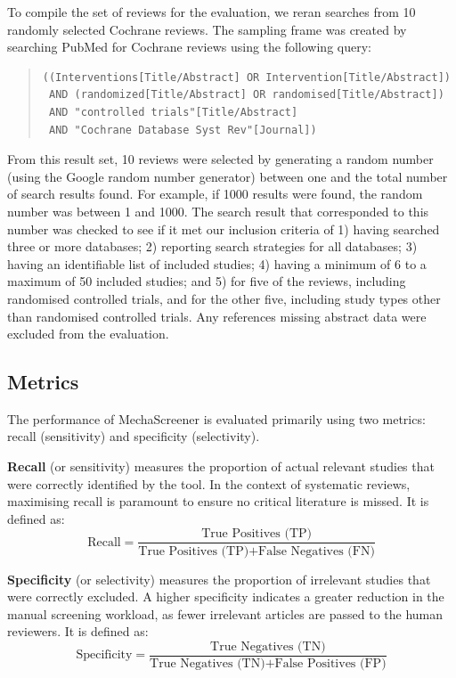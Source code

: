 \documentclass[11pt,a4paper]{article}
\begin{document}
To compile the set of reviews for the evaluation, we reran searches from 10 randomly selected Cochrane reviews. The sampling frame was created by searching PubMed for Cochrane reviews using the following query:
\begin{quote}
\begin{verbatim}
((Interventions[Title/Abstract] OR Intervention[Title/Abstract])
 AND (randomized[Title/Abstract] OR randomised[Title/Abstract])
 AND "controlled trials"[Title/Abstract]
 AND "Cochrane Database Syst Rev"[Journal])
\end{verbatim}
\end{quote}
From this result set, 10 reviews were selected by generating a random number (using the Google random number generator) between one and the total number of search results found. For example, if 1000 results were found, the random number was between 1 and 1000. The search result that corresponded to this number was checked to see if it met our inclusion criteria of 1) having searched three or more databases; 2) reporting search strategies for all databases; 3) having an identifiable list of included studies; 4) having a minimum of 6 to a maximum of 50 included studies; and 5) for five of the reviews, including randomised controlled trials, and for the other five, including study types other than randomised controlled trials. Any references missing abstract data were excluded from the evaluation.

\subsection{Metrics}

The performance of MechaScreener is evaluated primarily using two metrics: recall (sensitivity) and specificity (selectivity). \bigbreak

\textbf{Recall} (or sensitivity) measures the proportion of actual relevant studies that were correctly identified by the tool. In the context of systematic reviews, maximising recall is paramount to ensure no critical literature is missed. It is defined as:
\begin{equation}
    \text{Recall} = \frac{\text{True Positives (TP)}}{\text{True Positives (TP)} + \text{False Negatives (FN)}}
\end{equation}

\textbf{Specificity} (or selectivity) measures the proportion of irrelevant studies that were correctly excluded. A higher specificity indicates a greater reduction in the manual screening workload, as fewer irrelevant articles are passed to the human reviewers. It is defined as:
\begin{equation}
    \text{Specificity} = \frac{\text{True Negatives (TN)}}{\text{True Negatives (TN)} + \text{False Positives (FP)}}
\end{equation}
\end{document}
